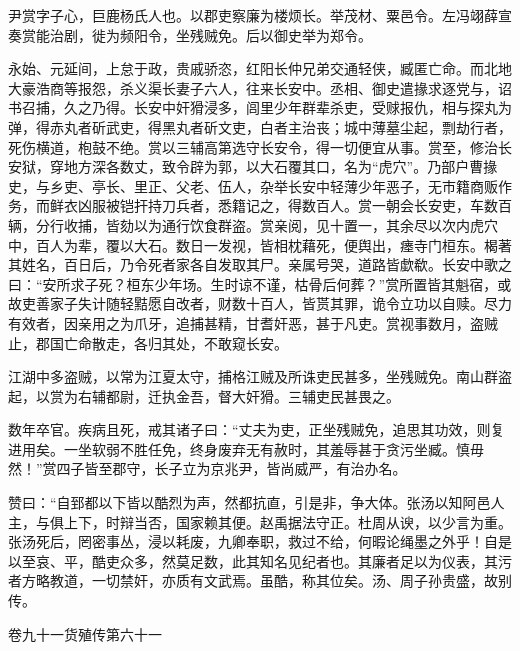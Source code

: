 \documentclass[12pt,UTF8]{ctexbook}
\begin{document}
尹赏字子心，巨鹿杨氏人也。以郡吏察廉为楼烦长。举茂材、粟邑令。左冯翊薛宣奏赏能治剧，徙为频阳令，坐残贼免。后以御史举为郑令。



永始、元延间，上怠于政，贵戚骄恣，红阳长仲兄弟交通轻侠，臧匿亡命。而北地大豪浩商等报怨，杀义渠长妻子六人，往来长安中。丞相、御史遣掾求逐党与，诏书召捕，久之乃得。长安中奸猾浸多，闾里少年群辈杀吏，受赇报仇，相与探丸为弹，得赤丸者斫武吏，得黑丸者斫文吏，白者主治丧；城中薄墓尘起，剽劫行者，死伤横道，枹鼓不绝。赏以三辅高第选守长安令，得一切便宜从事。赏至，修治长安狱，穿地方深各数丈，致令辟为郭，以大石覆其口，名为“虎穴”。乃部户曹掾史，与乡吏、亭长、里正、父老、伍人，杂举长安中轻薄少年恶子，无市籍商贩作务，而鲜衣凶服被铠扞持刀兵者，悉籍记之，得数百人。赏一朝会长安吏，车数百辆，分行收捕，皆劾以为通行饮食群盗。赏亲阅，见十置一，其余尽以次内虎穴中，百人为辈，覆以大石。数日一发视，皆相枕藉死，便舆出，瘗寺门桓东。楬著其姓名，百日后，乃令死者家各自发取其尸。亲属号哭，道路皆歔欷。长安中歌之曰：“安所求子死？桓东少年场。生时谅不谨，枯骨后何葬？”赏所置皆其魁宿，或故吏善家子失计随轻黠愿自改者，财数十百人，皆贳其罪，诡令立功以自赎。尽力有效者，因亲用之为爪牙，追捕甚精，甘耆奸恶，甚于凡吏。赏视事数月，盗贼止，郡国亡命散走，各归其处，不敢窥长安。



江湖中多盗贼，以常为江夏太守，捕格江贼及所诛吏民甚多，坐残贼免。南山群盗起，以赏为右辅都尉，迁执金吾，督大奸猾。三辅吏民甚畏之。



数年卒官。疾病且死，戒其诸子曰：“丈夫为吏，正坐残贼免，追思其功效，则复进用矣。一坐软弱不胜任免，终身废弃无有赦时，其羞辱甚于贪污坐臧。慎毋然！”赏四子皆至郡守，长子立为京兆尹，皆尚威严，有治办名。



赞曰：“自郅都以下皆以酷烈为声，然都抗直，引是非，争大体。张汤以知阿邑人主，与俱上下，时辩当否，国家赖其便。赵禹据法守正。杜周从谀，以少言为重。张汤死后，罔密事丛，浸以耗废，九卿奉职，救过不给，何暇论绳墨之外乎！自是以至哀、平，酷吏众多，然莫足数，此其知名见纪者也。其廉者足以为仪表，其污者方略教道，一切禁奸，亦质有文武焉。虽酷，称其位矣。汤、周子孙贵盛，故别传。





卷九十一货殖传第六十一
\end{document}
